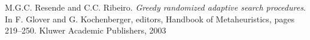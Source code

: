 \begin{thebibliography}{9}

M.G.C. Resende and C.C. Ribeiro. 
\textit{Greedy randomized adaptive search procedures}. 
In F. Glover and G. Kochenberger, editors, Handbook of Metaheuristics, pages 219–250. Kluwer Academic Publishers, 2003


  

 
\end{thebibliography}